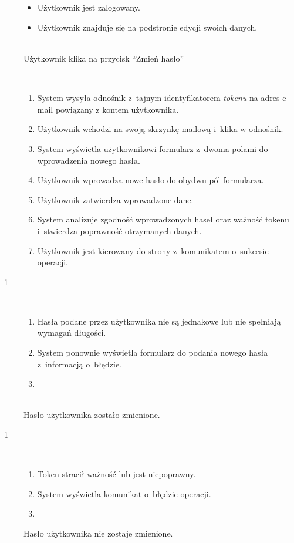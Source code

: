 \documentclass[11pt]{aghdpl}
\begin{document}
	\begin{description}
		\item[\useCaseAktor] \hfill \\
			\useCaseUzytkownik
		\item[\useCaseWarPocz] \hfill \\
			\begin{itemize}
				\item Użytkownik jest zalogowany.
				\item Użytkownik znajduje się na podstronie edycji swoich danych.
			\end{itemize}
		\item[\useCaseZdarzInicj] \hfill \\
			Użytkownik klika na przycisk ``Zmień hasło''
		\item[\useCaseScenBaz] \hfill \\ 
			\begin{enumerate}
				\item System wysyła odnośnik z~tajnym identyfikatorem \emph{tokenu} na adres e-mail powiązany z kontem użytkownika.
				\item Użytkownik wchodzi na swoją skrzynkę mailową i~klika w odnośnik.
				\item System wyświetla użytkownikowi formularz z~dwoma polami do wprowadzenia nowego hasła.
				\item Użytkownik wprowadza nowe hasło do obydwu pól formularza.
				\item Użytkownik zatwierdza wprowadzone dane.
				\item System analizuje zgodność wprowadzonych haseł oraz ważność tokenu i~stwierdza poprawność otrzymanych danych.
				\item Użytkownik jest kierowany do strony z~komunikatem o~sukcesie operacji.
			\end{enumerate}
		\item[\useCaseScenAlt~1] \hfill \\
			\begin{enumerate}[label=11a\arabic*.]
				\item Hasła podane przez użytkownika nie są jednakowe lub nie spełniają wymagań długości.
				\item System ponownie wyświetla formularz do podania nowego hasła z~informacją o~błędzie.
				\item {}
			\end{enumerate}
		\item[\useCaseWarKonc] \hfill \\ 
			Hasło użytkownika zostało zmienione.
		\item[\useCaseWyjatek~1] \hfill \\
			\begin{enumerate}[label=11b\arabic*.]
				\item Token stracił ważność lub jest niepoprawny.
				\item System wyświetla komunikat o~błędzie operacji.
				\item \useCaseEnd
			\end{enumerate}
			Hasło użytkownika nie zostaje zmienione.
	\end{description}
	
\end{document}
